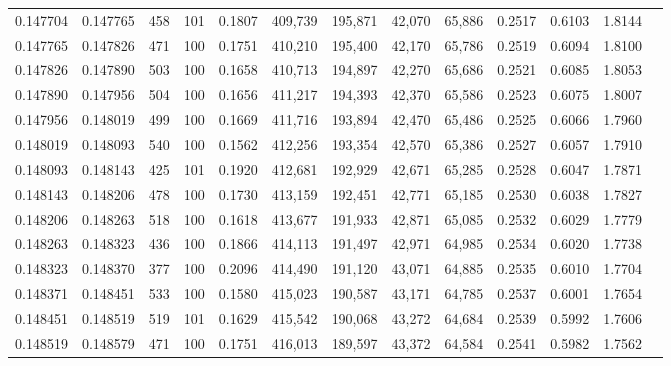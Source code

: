 \begin{tabular}{rrrrrrrrrrrrr}
0.147704 & 0.147765 &   458 & 101 &                                     0.1807 & 409,739 & 195,871 &  42,070 &  65,886 & 0.2517 & 0.6103 & 1.8144 \\
0.147765 & 0.147826 &   471 & 100 &                                     0.1751 & 410,210 & 195,400 &  42,170 &  65,786 & 0.2519 & 0.6094 & 1.8100 \\
0.147826 & 0.147890 &   503 & 100 &                                     0.1658 & 410,713 & 194,897 &  42,270 &  65,686 & 0.2521 & 0.6085 & 1.8053 \\
0.147890 & 0.147956 &   504 & 100 &                                     0.1656 & 411,217 & 194,393 &  42,370 &  65,586 & 0.2523 & 0.6075 & 1.8007 \\
0.147956 & 0.148019 &   499 & 100 &                                     0.1669 & 411,716 & 193,894 &  42,470 &  65,486 & 0.2525 & 0.6066 & 1.7960 \\
0.148019 & 0.148093 &   540 & 100 &                                     0.1562 & 412,256 & 193,354 &  42,570 &  65,386 & 0.2527 & 0.6057 & 1.7910 \\
0.148093 & 0.148143 &   425 & 101 &                                     0.1920 & 412,681 & 192,929 &  42,671 &  65,285 & 0.2528 & 0.6047 & 1.7871 \\
0.148143 & 0.148206 &   478 & 100 &                                     0.1730 & 413,159 & 192,451 &  42,771 &  65,185 & 0.2530 & 0.6038 & 1.7827 \\
0.148206 & 0.148263 &   518 & 100 &                                     0.1618 & 413,677 & 191,933 &  42,871 &  65,085 & 0.2532 & 0.6029 & 1.7779 \\
0.148263 & 0.148323 &   436 & 100 &                                     0.1866 & 414,113 & 191,497 &  42,971 &  64,985 & 0.2534 & 0.6020 & 1.7738 \\
0.148323 & 0.148370 &   377 & 100 &                                     0.2096 & 414,490 & 191,120 &  43,071 &  64,885 & 0.2535 & 0.6010 & 1.7704 \\
0.148371 & 0.148451 &   533 & 100 &                                     0.1580 & 415,023 & 190,587 &  43,171 &  64,785 & 0.2537 & 0.6001 & 1.7654 \\
0.148451 & 0.148519 &   519 & 101 &                                     0.1629 & 415,542 & 190,068 &  43,272 &  64,684 & 0.2539 & 0.5992 & 1.7606 \\
0.148519 & 0.148579 &   471 & 100 &                                     0.1751 & 416,013 & 189,597 &  43,372 &  64,584 & 0.2541 & 0.5982 & 1.7562 \\

\end{tabular}
